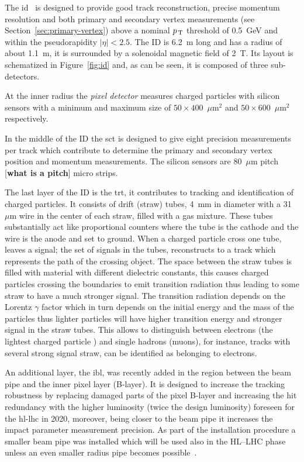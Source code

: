 The \gls{id}~\cite{ATLASPaper} is designed to provide good track reconstruction,
precise momentum resolution and both primary and secondary vertex measurements
(see Section~\ref{sec:primary-vertex}) above a nominal $p_\mathrm{\, T}$ threshold of
0.5~GeV and within the pseudorapidity $|\eta| < 2.5$. The ID is 6.2~m long and
has a radius of about 1.1~m, it is surrounded by a solenoidal magnetic field of
2~T. Its layout is schematized in Figure~\ref{fig:id} and, as can be seen, it is
composed of three sub-detectors.

At the inner radius the \emph{pixel detector} measures charged particles with
silicon sensors with a minimum and maximum size of $50 \times 400$~$\mu$m$^2$
and $50 \times 600$~$\mu$m$^2$ respectively.

In the middle of the ID the \gls{sct} is designed to give eight precision
measurements per track which contribute to determine the primary and secondary
vertex position and momentum measurements. The silicon sensors are 80~$\mu$m
pitch [\textbf{what is a pitch}] micro strips.

The last layer of the ID is the \gls{trt}, it contributes to tracking and
identification of charged particles. It consists of drift (straw) tubes, 4~mm in
diameter with a 31~$\mu$m wire in the center of each straw, filled with a gas
mixture. These tubes substantially act like proportional counters where the tube
is the cathode and the wire is the anode and set to ground. When a charged
particle cross one tube, leaves a signal; the set of signals in the tubes,
reconstructs to a track which represents the path of the crossing object. The
space between the straw tubes is filled with material with different dielectric
constants, this causes charged particles crossing the boundaries to emit
transition radiation thus leading to some straw to have a much stronger
signal. The transition radiation depends on the Lorentz $\gamma$ factor which in
turn depends on the initial energy and the mass of the particles thus lighter
particles will have higher transition energy and stronger signal in the straw
tubes. This allows to distinguish between electrons (the lightest charged
particle ) and single hadrons (muons), for instance, tracks with several strong
signal straw, can be identified as belonging to electrons.

An additional layer, the \gls{ibl}, was recently added in the region between the
beam pipe and the inner pixel layer (B-layer). It is designed to increase the
tracking robustness by replacing damaged parts of the pixel B-layer and
increasing the hit redundancy with the higher luminosity (twice the design
luminosity) foreseen for the \gls{hl-lhc} in 2020, moreover, being closer to the
beam pipe it increases the impact parameter measurement precision. As part of
the installation procedure a smaller beam pipe was installed which will be used
also in the HL--LHC phase unless an even smaller radius pipe becomes
possible~\cite{IBL}.

